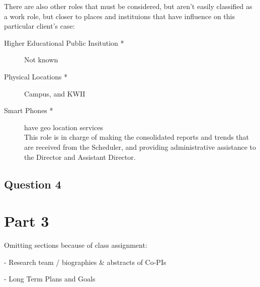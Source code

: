 \documentclass[11pt]{article}
\begin{document}
  There are also other roles that must be considered, but aren't easily classified as a work role, but closer to places and instituions that have influence on this particular client's case:
  \begin{description} %
    \item[Higher Educational Public Insitution \**]
    Not known\\
    \item[Physical Locations \**]
    Campus, and KWII\\
    \item[Smart Phones \**]
    have geo location services\\
    This role is in charge of making the consolidated reports and trends that are received from the Scheduler, and providing administrative assistance to the Director and Assistant Director. 
    \end{description}


  \subsection{Question 4}

\section*{Part 3} %


\newpage



Omitting sections because of class assignment:

 - Research team / biographies \& abstracts of Co-PIs

 - Long Term Plans and Goals
\end{document}
